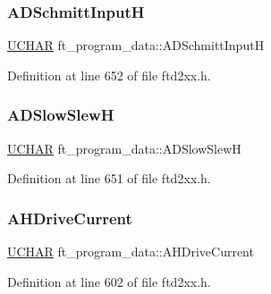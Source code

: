 \subsubsection{\texorpdfstring{A\+D\+Schmitt\+InputH}{ADSchmittInputH}}
{\footnotesize\ttfamily \hyperlink{CatCaloProto40MHz_2inc_2WinTypes_8h_a4f4bb67531a9bf6f0b9c6ad76aeba587}{U\+C\+H\+AR} ft\+\_\+program\+\_\+data\+::\+A\+D\+Schmitt\+InputH}



Definition at line 652 of file ftd2xx.\+h.

\mbox{\label{structft__program__data_a315e8f813bdc38650a43cb1aa2076a58}} 
\subsubsection{\texorpdfstring{A\+D\+Slow\+SlewH}{ADSlowSlewH}}
{\footnotesize\ttfamily \hyperlink{CatCaloProto40MHz_2inc_2WinTypes_8h_a4f4bb67531a9bf6f0b9c6ad76aeba587}{U\+C\+H\+AR} ft\+\_\+program\+\_\+data\+::\+A\+D\+Slow\+SlewH}



Definition at line 651 of file ftd2xx.\+h.

\mbox{\label{structft__program__data_add4068d542250349defc0ad9f6a51d3b}} 
\subsubsection{\texorpdfstring{A\+H\+Drive\+Current}{AHDriveCurrent}}
{\footnotesize\ttfamily \hyperlink{CatCaloProto40MHz_2inc_2WinTypes_8h_a4f4bb67531a9bf6f0b9c6ad76aeba587}{U\+C\+H\+AR} ft\+\_\+program\+\_\+data\+::\+A\+H\+Drive\+Current}



Definition at line 602 of file ftd2xx.\+h.

\mbox{\label{structft__program__data_a6a6ae4b35632934297bc50385b18ddb1}} 
